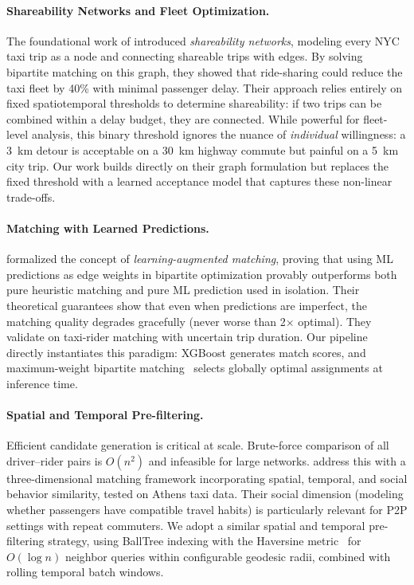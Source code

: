 \documentclass{article}
\begin{document}
\paragraph{Shareability Networks and Fleet Optimization.}
The foundational work of \citet{santi2014quantifying} introduced \emph{shareability networks}, modeling every NYC taxi trip as a node and connecting shareable trips with edges. By solving bipartite matching on this graph, they showed that ride-sharing could reduce the taxi fleet by 40\% with minimal passenger delay. Their approach relies entirely on fixed spatiotemporal thresholds to determine shareability: if two trips can be combined within a delay budget, they are connected. While powerful for fleet-level analysis, this binary threshold ignores the nuance of \emph{individual} willingness: a 3~km detour is acceptable on a 30~km highway commute but painful on a 5~km city trip. Our work builds directly on their graph formulation but replaces the fixed threshold with a learned acceptance model that captures these non-linear trade-offs.

\paragraph{Matching with Learned Predictions.}
\citet{bjorck2021learning} formalized the concept of \emph{learning-augmented matching}, proving that using ML predictions as edge weights in bipartite optimization provably outperforms both pure heuristic matching and pure ML prediction used in isolation. Their theoretical guarantees show that even when predictions are imperfect, the matching quality degrades gracefully (never worse than 2$\times$ optimal). They validate on taxi-rider matching with uncertain trip duration. Our pipeline directly instantiates this paradigm: XGBoost generates match scores, and maximum-weight bipartite matching~\citep{kuhn1955hungarian} selects globally optimal assignments at inference time.

\paragraph{Spatial and Temporal Pre-filtering.}
Efficient candidate generation is critical at scale. Brute-force comparison of all driver--rider pairs is $O(n^2)$ and infeasible for large networks. \citet{anagnostopoulos2025vehicle} address this with a three-dimensional matching framework incorporating spatial, temporal, and social behavior similarity, tested on Athens taxi data. Their social dimension (modeling whether passengers have compatible travel habits) is particularly relevant for P2P settings with repeat commuters. We adopt a similar spatial and temporal pre-filtering strategy, using BallTree indexing with the Haversine metric~\citep{omohundro1989five} for $O(\log n)$ neighbor queries within configurable geodesic radii, combined with rolling temporal batch windows.
\end{document}
